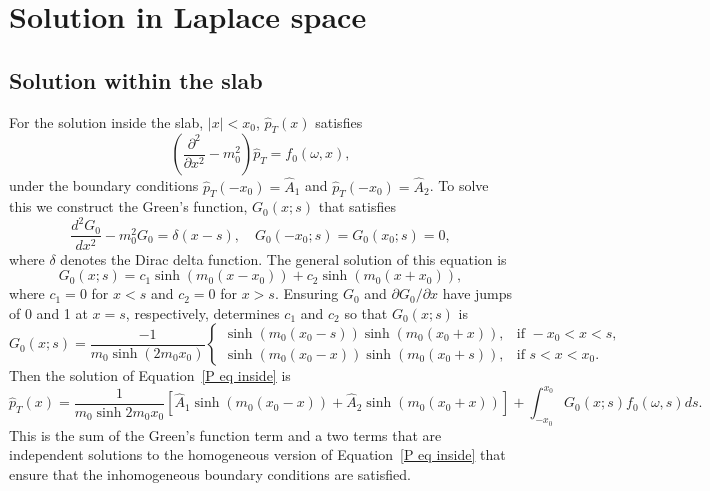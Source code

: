 \documentclass[12pt]{../style-files/ociamthesis}
\begin{document}
\section{Solution in Laplace space}

\subsection{Solution within the slab}
For the solution inside the slab, $|x| < x_0$, $\hat{p}_T(x)$ satisfies
\begin{equation}
\left( \frac{\partial^2}{\partial x^2} - m_0^2 \right) \hat{p}_T = f_0(\omega, x),
\end{equation}
under the boundary conditions $\hat{p}_T(-x_0) = \hat{A}_1$ and $\hat{p}_T(-x_0) = \hat{A}_2$. To solve this we construct the Green's function, $G_0(x;s)$ that satisfies
\begin{equation}
\frac{d^2G_0}{dx^2} - m_0^2 G_0 = \delta(x-s), \quad G_0(-x_0;s) = G_0(x_0;s) = 0,
\end{equation}
where $\delta$ denotes the Dirac delta function. The general solution of this equation is
\begin{equation}
G_0(x;s) = c_1\sinh(m_0(x - x_0)) + c_2\sinh(m_0(x + x_0)),
\end{equation}
where $c_1 = 0$ for $x < s$ and $c_2 = 0$ for $x > s$. Ensuring $G_0$ and $\partial G_0 / \partial x$ have jumps of 0 and 1 at $x = s$, respectively, determines $c_1$ and $c_2$ so that $G_0(x;s)$ is
\begin{equation}
G_0(x;s) = \frac{-1}{m_0\sinh(2m_0 x_0)}
\begin{cases}
\sinh(m_0(x_0 - s))\sinh(m_0(x_0 + x)), & \text{if } -x_0<x<s, \\
\sinh(m_0(x_0 - x))\sinh(m_0(x_0 + s)), & \text{if } s<x<x_0.
\end{cases}
\end{equation}
Then the solution of Equation~\eqref{P eq inside} is
\begin{equation}
\hat{p}_T(x) = \frac{1}{m_0\sinh{2m_0 x_0}} \left[ \hat{A}_1\sinh(m_0(x_0 - x)) + \hat{A}_2\sinh(m_0(x_0 + x)) \right] + \int_{-x_0}^{x_0} G_0(x;s) f_0(\omega, s) ds.
\label{P sol 0}
\end{equation}
This is the sum of the Green's function term and a two terms that are independent solutions to the homogeneous version of Equation~\eqref{P eq inside} that ensure that the inhomogeneous boundary conditions are satisfied.
\end{document}
